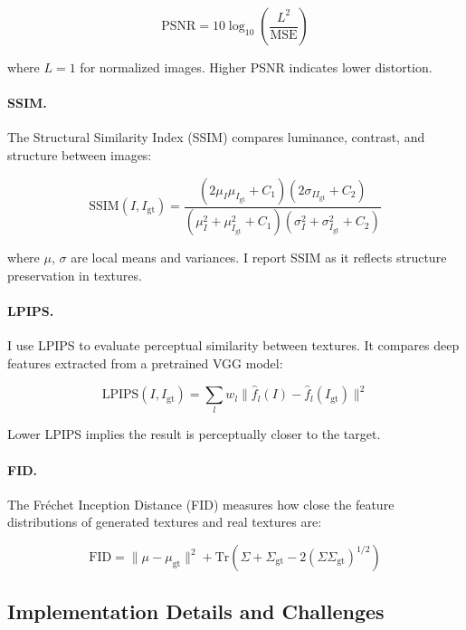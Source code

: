 \begin{equation}
\text{PSNR} = 10 \log_{10} \left( \frac{L^2}{\text{MSE}} \right)
\end{equation}

where $L=1$ for normalized images. Higher PSNR indicates lower distortion.

\paragraph{SSIM.} The Structural Similarity Index (SSIM) compares luminance, contrast, and structure between images:

\begin{equation}
\text{SSIM}(I, I_{\text{gt}}) = \frac{(2\mu_I \mu_{I_{\text{gt}}} + C_1)(2\sigma_{I I_{\text{gt}}} + C_2)}{(\mu_I^2 + \mu_{I_{\text{gt}}}^2 + C_1)(\sigma_I^2 + \sigma_{I_{\text{gt}}}^2 + C_2)}
\end{equation}

where $\mu$, $\sigma$ are local means and variances. I report SSIM as it reflects structure preservation in textures.

\paragraph{LPIPS.} I use LPIPS to evaluate perceptual similarity between textures. It compares deep features extracted from a pretrained VGG model:

\begin{equation}
\text{LPIPS}(I, I_{\text{gt}}) = \sum_l w_l \| \hat{f}_l(I) - \hat{f}_l(I_{\text{gt}}) \|^2
\end{equation}

Lower LPIPS implies the result is perceptually closer to the target.

\paragraph{FID.} The Fréchet Inception Distance (FID) measures how close the feature distributions of generated textures and real textures are:

\begin{equation}
\text{FID} = \| \mu - \mu_{\text{gt}} \|^2 + \text{Tr}( \Sigma + \Sigma_{\text{gt}} - 2 (\Sigma \Sigma_{\text{gt}})^{1/2} )
\end{equation}


\subsection{Implementation Details and Challenges}

